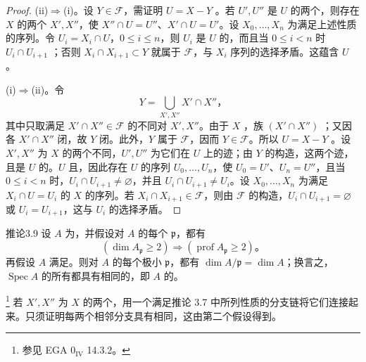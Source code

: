 \begin{proof}
(ii)$\Rightarrow$(i)。设 $Y\in\mathcal F$，需证明 $U=X-Y$ 。若 $U',U''$ 是 $U$ 的两个，则存在 $X$ 的两个 $X',X''$，使 $X''\cap U=U''$、$X'\cap U=U'$。设 $X_0,\ldots,X_n$ 为满足上述性质的序列。令 $U_i=X_i\cap U$，$0\le i\le n$，则 $U_i$ 是 $U$ 的，而且当 $0\le i<n$ 时 $U_i\cap U_{i+1}$ ；否则 $X_i\cap X_{i+1}\subset Y$ 就属于 $\mathcal F$，与 $X_i$ 序列的选择矛盾。这蕴含 $U$ 。

(i)$\Rightarrow$(ii)。令
\[
Y=\bigcup_{X',X''}X'\cap X''，
\]
其中只取满足 $X'\cap X''\in\mathcal F$ 的不同对 $X',X''$。由于 $X$ ，族 $(X'\cap X'')$ ；又因各 $X'\cap X''$ 闭，故 $Y$ 闭。此外，$Y$ 属于 $\mathcal F$，因而 $Y\in\mathcal F$。所以 $U=X-Y$ 。设 $X',X''$ 为 $X$ 的两个不同，$U',U''$ 为它们在 $U$ 上的迹；由 $Y$ 的构造，这两个迹，且是 $U$ 的。$U$ 且，因此存在 $U$ 的序列 $U_0,\ldots,U_n$，使 $U_0=U'$、$U_n=U''$，且当 $0\le i<n$ 时，$U_i\cap U_{i+1}\ne\varnothing$，并且 $U_i\cap U_{i+1}\ne U_i$。设 $X_0,\ldots,X_n$ 为满足 $X_i\cap U=U_i$ 的 $X$ 的序列。若 $X_i\cap X_{i+1}\in\mathcal F$，则由 $\mathcal F$ 的构造，$U_i\cap U_{i+1}=\varnothing$ 或 $U_i=U_{i+1}$，这与 $U_i$ 的选择矛盾。
\end{proof}

\begin{SGAresult}{推论}{3.9}
设 $A$ 为，并假设对 $A$ 的每个 $\mathfrak p$，都有
\[
(\dim A_{\mathfrak p}\ge2)\Longrightarrow
(\operatorname{prof}A_{\mathfrak p}\ge2)。
\]
再假设 $A$ 满足。则对 $A$ 的每个极小 $\mathfrak p$，都有 $\dim A/\mathfrak p=\dim A$；换言之，$\operatorname{Spec}A$ 的所有都具有相同的，即 $A$ 的。
\end{SGAresult}
\footnote{参见 EGA $0_{\mathrm{IV}}$ 14.3.2。}
若 $X',X''$ 为 $X$ 的两个，用一个满足推论 3.7 中所列性质的分支链将它们连接起来。只须证明每两个相邻分支具有相同，这由第二个假设得到。

